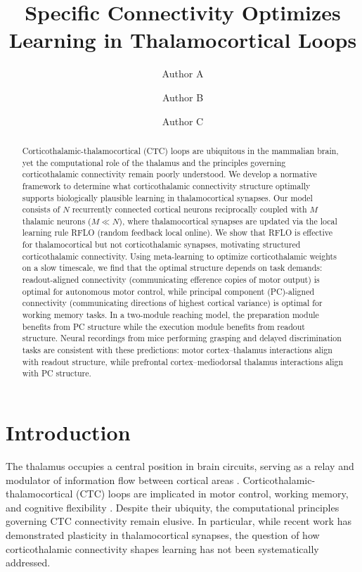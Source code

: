 \documentclass[11pt]{article}
\title{Specific Connectivity Optimizes Learning in Thalamocortical Loops}
\author[1]{Author A}
\author[1]{Author B}
\author[2]{Author C}
\affil[1]{Department of Neuroscience, Columbia University, New York, NY, USA}
\affil[2]{Zuckerman Mind Brain Behavior Institute, Columbia University, New York, NY, USA}
\date{}
\begin{document}
\maketitle

\begin{abstract}
Corticothalamic-thalamocortical (CTC) loops are ubiquitous in the mammalian brain, yet the computational role of the thalamus and the principles governing corticothalamic connectivity remain poorly understood. We develop a normative framework to determine what corticothalamic connectivity structure optimally supports biologically plausible learning in thalamocortical synapses. Our model consists of $N$ recurrently connected cortical neurons reciprocally coupled with $M$ thalamic neurons ($M \ll N$), where thalamocortical synapses are updated via the local learning rule RFLO (random feedback local online). We show that RFLO is effective for thalamocortical but not corticothalamic synapses, motivating structured corticothalamic connectivity. Using meta-learning to optimize corticothalamic weights on a slow timescale, we find that the optimal structure depends on task demands: readout-aligned connectivity (communicating efference copies of motor output) is optimal for autonomous motor control, while principal component (PC)-aligned connectivity (communicating directions of highest cortical variance) is optimal for working memory tasks. In a two-module reaching model, the preparation module benefits from PC structure while the execution module benefits from readout structure. Neural recordings from mice performing grasping and delayed discrimination tasks are consistent with these predictions: motor cortex--thalamus interactions align with readout structure, while prefrontal cortex--mediodorsal thalamus interactions align with PC structure.
\end{abstract}

\section{Introduction}

The thalamus occupies a central position in brain circuits, serving as a relay and modulator of information flow between cortical areas \citep{sherman2001thalamus, halassa2017thalamic}. Corticothalamic-thalamocortical (CTC) loops are implicated in motor control, working memory, and cognitive flexibility \citep{guo2017maintenance, schmitt2017thalamic, sauerbrei2020cortical}. Despite their ubiquity, the computational principles governing CTC connectivity remain elusive. In particular, while recent work has demonstrated plasticity in thalamocortical synapses, the question of how corticothalamic connectivity shapes learning has not been systematically addressed.
\end{document}

